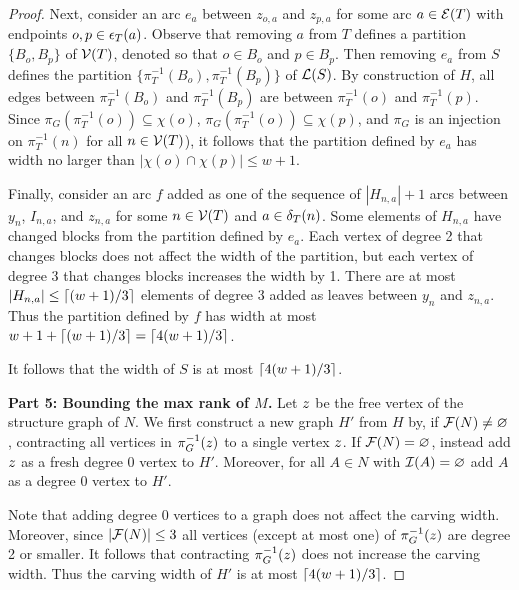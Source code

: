 \begin{proof}
Next, consider an arc $e_a$ between $z_{o,a}$ and $z_{p,a}$ for some arc $a \in \mathcal{E}(T)$ with endpoints $o, p \in \epsilon_{T}(a)$.
Observe that removing $a$ from $T$ defines a partition $\{B_o, B_p\}$ of $\mathcal{V}(T)$, denoted so that $o \in B_o$ and $p \in B_p$. Then removing $e_a$ from $S$ defines the partition $\{ \pi_T^{-1}(B_o), \pi_T^{-1}(B_p) \}$ of $\mathcal{L}(S)$. By construction of $H$, all edges between $\pi_T^{-1}(B_o)$ and $\pi_T^{-1}(B_p)$ are between $\pi_T^{-1}(o)$ and $\pi_T^{-1}(p)$. Since $\pi_G(\pi_T^{-1}(o)) \subseteq \chi(o)$, $\pi_G(\pi_T^{-1}(o)) \subseteq \chi(p)$, and $\pi_G$ is an injection on $\pi_T^{-1}(n)$ for all $n \in \mathcal{V}(T)$), it follows that the partition defined by $e_a$ has width no larger than $|\chi(o) \cap \chi(p)| \leq w+1$. 

Finally, consider an arc $f$ added as one of the sequence of $|H_{n,a}|+1$ arcs between $y_n$, $I_{n,a}$, and $z_{n,a}$ for some $n \in \mathcal{V}(T)$ and $a \in \delta_{T}(n)$. Some elements of $H_{n,a}$ have changed blocks from the partition defined by $e_a$. Each vertex of degree 2 that changes blocks does not affect the width of the partition, but each vertex of degree 3 that changes blocks increases the width by 1. There are at most $|H_{n,a}| \leq \lceil(w+1)/3\rceil$ elements of degree 3 added as leaves between $y_n$ and $z_{n,a}$. Thus the partition defined by $f$ has width at most $w + 1 + \lceil(w+1)/3\rceil = \lceil4(w+1)/3\rceil$.

It follows that the width of $S$ is at most $\lceil4(w+1)/3\rceil$.

\textbf{Part 5: Bounding the max rank of $M$.} Let $z$ be the free vertex of the structure graph of $N$. We first construct a new graph $H'$ from $H$ by, if $\mathcal{F}(N) \neq \varnothing$, contracting all vertices in $\pi_G^{-1}(z)$ to a single vertex $z$. If $\mathcal{F}(N) = \varnothing$, instead add $z$ as a fresh degree 0 vertex to $H'$. Moreover, for all $A \in N$ with $\mathcal{I}(A) = \varnothing$ add $A$ as a degree 0 vertex to $H'$. 

Note that adding degree 0 vertices to a graph does not affect the carving width. Moreover, since $|\mathcal{F}(N)| \leq 3$ all vertices (except at most one) of $\pi_G^{-1}(z)$ are degree 2 or smaller. It follows that contracting $\pi_G^{-1}(z)$ does not increase the carving width. Thus the carving width of $H'$ is at most $\lceil4(w+1)/3\rceil$.


\end{proof}
